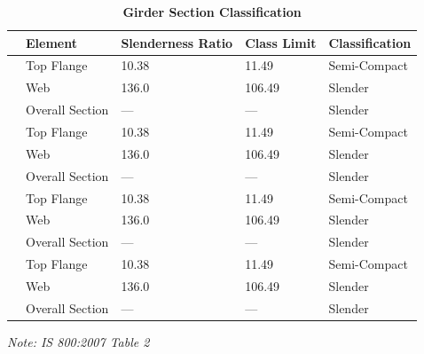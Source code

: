 \documentclass[12pt,a4paper]{report}
\numberwithin{table}{chapter}
\numberwithin{figure}{chapter}
\begin{document}
\vspace{1em}
\begin{longtable}{|C{2.5cm}|L{3cm}|C{3.5cm}|C{2.5cm}|>{\centering\arraybackslash}p{4.0cm}|}
\caption{\textbf{Girder Section Classification}}
\hline
\textbf{} & \textbf{Element} & \textbf{Slenderness Ratio} & \textbf{Class Limit} & \textbf{Classification} \\[6pt]
\hline
{} & Top Flange & 10.38 & 11.49 & Semi-Compact \\[6pt]
 & Web & 136.0 & 106.49 & Slender \\[6pt]
 & Overall Section & --- & --- & Slender \\[6pt]
\hline
{} & Top Flange & 10.38 & 11.49 & Semi-Compact \\[6pt]
 & Web & 136.0 & 106.49 & Slender \\[6pt]
 & Overall Section & --- & --- & Slender \\[6pt]
\hline
{} & Top Flange & 10.38 & 11.49 & Semi-Compact \\[6pt]
 & Web & 136.0 & 106.49 & Slender \\[6pt]
 & Overall Section & --- & --- & Slender \\[6pt]
\hline
{} & Top Flange & 10.38 & 11.49 & Semi-Compact \\[6pt]
 & Web & 136.0 & 106.49 & Slender \\[6pt]
 & Overall Section & --- & --- & Slender \\[6pt]
\hline
\end{longtable}
\noindent\textit{Note: IS 800:2007 Table 2}
\end{document}
